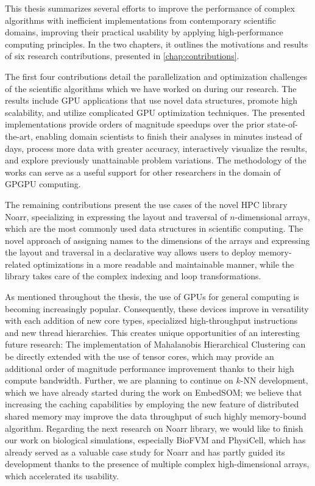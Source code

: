 
This thesis summarizes several efforts to improve the performance of complex algorithms with inefficient implementations from contemporary scientific domains, improving their practical usability by applying high-performance computing principles. In the two chapters, it outlines the motivations and results of six research contributions, presented in \cref{chap:contributions}.

The first four contributions detail the parallelization and optimization challenges of the scientific algorithms which we have worked on during our research. The results include GPU applications that use novel data structures, promote high scalability, and utilize complicated GPU optimization techniques. The presented implementations provide orders of magnitude speedups over the prior state-of-the-art, enabling domain scientists to finish their analyses in minutes instead of days, process more data with greater accuracy, interactively visualize the results, and explore previously unattainable problem variations. The methodology of the works can serve as a useful support for other researchers in the domain of GPGPU computing.

The remaining contributions present the use cases of the novel HPC library Noarr, specializing in expressing the layout and traversal of $n$-dimensional arrays, which are the most commonly used data structures in scientific computing. The novel approach of assigning names to the dimensions of the arrays and expressing the layout and traversal in a declarative way allows users to deploy memory-related optimizations in a more readable and maintainable manner, while the library takes care of the complex indexing and loop transformations.

As mentioned throughout the thesis, the use of GPUs for general computing is becoming increasingly popular. Consequently, these devices improve in versatility with each addition of new core types, specialized high-throughput instructions and new thread hierarchies. This creates unique opportunities of an interesting future research: The implementation of Mahalanobis Hierarchical Clustering can be directly extended with the use of tensor cores, which may provide an additional order of magnitude performance improvement thanks to their high compute bandwidth. Further, we are planning to continue on $k$-NN development, which we have already started during the work on EmbedSOM; we believe that increasing the caching capabilities by employing the new feature of distributed shared memory may improve the data throughput of such highly memory-bound algorithm. Regarding the next research on Noarr library, we would like to finish our work on biological simulations, especially BioFVM and PhysiCell, which has already served as a valuable case study for Noarr and has partly guided its development thanks to the presence of multiple complex high-dimensional arrays, which accelerated its usability.

